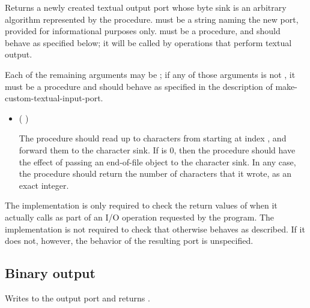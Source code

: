 \begin{entry}{%
}

Returns a newly created textual output port whose byte sink is
an arbitrary algorithm represented by the  procedure.
 must be a string naming the new port,
provided for informational purposes only.
 must be a procedure, and should behave as specified
below; it will be called by operations that perform textual output.

Each of the remaining arguments may be \schfalse{}; if any of
those arguments is not \schfalse{}, it must be a procedure and
should behave as specified in the description of
{\cf make-custom-textual-input-port}.
   
\begin{itemize}
\item {\cf (   )}
       
  The  procedure should read up to  characters
  from  starting at index , and forward
  them to the character sink.
  If  is 0, then the  procedure should
  have the effect of passing an end-of-file object to the character sink.
  In any case, the  procedure should return the number of
  characters that it wrote, as an exact integer.
\end{itemize}

\implresp The implementation is only required to check the return
values of  when it actually calls  as part of
an I/O operation requested by the program.  The implementation is not
required to check that  otherwise behaves as described.
If it does not, however, the behavior of the resulting port is
unspecified.
\end{entry}

\subsection{Binary output}

\begin{entry}{%
}

Writes  to the output port and returns \unspecifiedreturn.
\end{entry}


